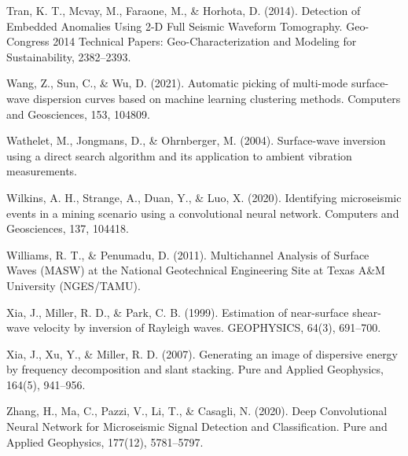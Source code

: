 Tran, K. T., Mcvay, M., Faraone, M., \& Horhota, D. (2014). Detection of Embedded Anomalies Using 2-D Full Seismic Waveform Tomography. Geo-Congress 2014 Technical Papers: Geo-Characterization and Modeling for Sustainability, 2382–2393. 

Wang, Z., Sun, C., \& Wu, D. (2021). Automatic picking of multi-mode surface-wave dispersion curves based on machine learning clustering methods. Computers and Geosciences, 153, 104809. 

Wathelet, M., Jongmans, D., \& Ohrnberger, M. (2004). Surface-wave inversion using a direct search algorithm and its application to ambient vibration measurements. 

Wilkins, A. H., Strange, A., Duan, Y., \& Luo, X. (2020). Identifying microseismic events in a mining scenario using a convolutional neural network. Computers and Geosciences, 137, 104418. 

Williams, R. T., \& Penumadu, D. (2011). Multichannel Analysis of Surface Waves (MASW) at the National Geotechnical Engineering Site at Texas A\&M University (NGES/TAMU).

Xia, J., Miller, R. D., \& Park, C. B. (1999). Estimation of near-surface shear-wave velocity by inversion of Rayleigh waves. GEOPHYSICS, 64(3), 691–700. 

Xia, J., Xu, Y., \& Miller, R. D. (2007). Generating an image of dispersive energy by frequency decomposition and slant stacking. Pure and Applied Geophysics, 164(5), 941–956. 

Zhang, H., Ma, C., Pazzi, V., Li, T., \& Casagli, N. (2020). Deep Convolutional Neural Network for Microseismic Signal Detection and Classification. Pure and Applied Geophysics, 177(12), 5781–5797. 



 